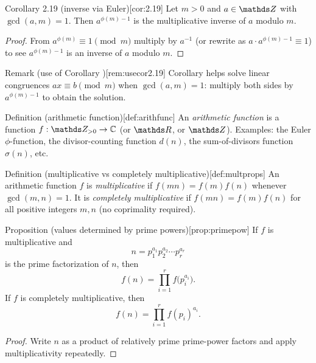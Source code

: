 \documentclass[10pt]{article}
\theoremstyle{definition}
\theoremstyle{plain}
\numberwithin{equation}{section}
\begin{document}
\begin{define}{Corollary 2.19 (inverse via Euler)}[cor:2.19]
Let $m>0$ and $a\in\setZ$ with $\gcd(a,m)=1$. Then $a^{\phi(m)-1}$ is the multiplicative
inverse of $a$ modulo $m$.
\end{define}

\begin{proof}
From $a^{\phi(m)}\equiv 1\pmod m$ multiply by $a^{-1}$ (or rewrite as $a\cdot a^{\phi(m)-1}\equiv 1$)
to see $a^{\phi(m)-1}$ is an inverse of $a$ modulo $m$.
\end{proof}

\begin{define}{Remark (use of Corollary )}[rem:usecor2.19]
Corollary  helps solve linear congruences $ax\equiv b\pmod m$ when
$\gcd(a,m)=1$: multiply both sides by $a^{\phi(m)-1}$ to obtain the solution.
\end{define}


\begin{define}{Definition (arithmetic function)}[def:arithfunc]
An \emph{arithmetic function} is a function $f:\setZ_{>0}\to\mathbb{C}$ (or $\setR$,
or $\setZ$). Examples: the Euler $\phi$-function, the divisor-counting function
$d(n)$, the sum-of-divisors function $\sigma(n)$, etc.
\end{define}

\begin{define}{Definition (multiplicative vs completely multiplicative)}[def:multprops]
An arithmetic function $f$ is \emph{multiplicative} if $f(mn)=f(m)f(n)$ whenever
$\gcd(m,n)=1$. It is \emph{completely multiplicative} if $f(mn)=f(m)f(n)$ for all
positive integers $m,n$ (no coprimality required).
\end{define}

\begin{define}{Proposition (values determined by prime powers)}[prop:primepow]
If $f$ is multiplicative and
\[
n = p_1^{a_1}p_2^{a_2}\cdots p_r^{a_r}
\]
is the prime factorization of $n$, then
\[
f(n)=\prod_{i=1}^r f\big(p_i^{a_i}\big).
\]
If $f$ is completely multiplicative, then
\[
f(n)=\prod_{i=1}^r f(p_i)^{a_i}.
\]
\end{define}

\begin{proof}
Write $n$ as a product of relatively prime prime-power factors and apply multiplicativity repeatedly.
\end{proof}
\end{document}
